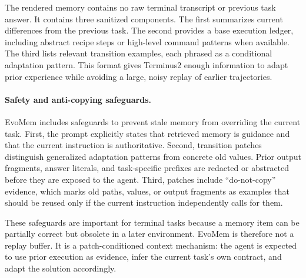 \documentclass{article}
\begin{document}
The rendered memory contains no raw terminal transcript or previous task answer. It contains three sanitized components. The first summarizes current differences from the previous task. The second provides a base execution ledger, including abstract recipe steps or high-level command patterns when available. The third lists relevant transition examples, each phrased as a conditional adaptation pattern. This format gives Terminus2 enough information to adapt prior experience while avoiding a large, noisy replay of earlier trajectories.

\paragraph{Safety and anti-copying safeguards.}
EvoMem includes safeguards to prevent stale memory from overriding the current task. First, the prompt explicitly states that retrieved memory is guidance and that the current instruction is authoritative. Second, transition patches distinguish generalized adaptation patterns from concrete old values. Prior output fragments, answer literals, and task-specific prefixes are redacted or abstracted before they are exposed to the agent. Third, patches include ``do-not-copy'' evidence, which marks old paths, values, or output fragments as examples that should be reused only if the current instruction independently calls for them.

These safeguards are important for terminal tasks because a memory item can be partially correct but obsolete in a later environment. EvoMem is therefore not a replay buffer. It is a patch-conditioned context mechanism: the agent is expected to use prior execution as evidence, infer the current task's own contract, and adapt the solution accordingly.
\end{document}
